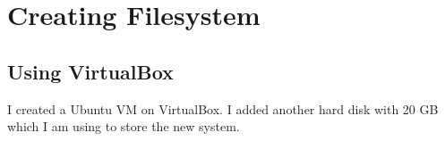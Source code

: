 \documentclass[12pt]{report}
\begin{document}
\chapter*{Creating Filesystem}
\section*{Using VirtualBox}
I created a Ubuntu VM on VirtualBox.  I added another hard disk with 20 GB which
I am using to store the new system.
\end{document}
